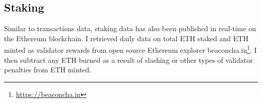 \documentclass[12pt]{article}
\begin{document}
\subsection{Staking}
Similar to transactions data, staking data has also been published in real-time on the Ethereum blockchain. I retrieved daily data on total ETH staked and ETH minted as validator rewards from open source Ethereum explorer beaconcha.in\footnote{\url{https://beaconcha.in}}. I then subtract any ETH burned as a result of slashing or other types of validator penalties from ETH minted.

\newpage


\newpage
\printbibliography
\end{document}
